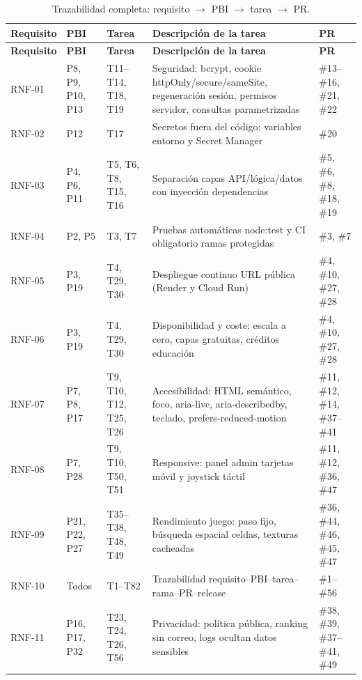 {\small
\sloppy
\begin{longtable}{@{}L{1.4cm} L{0.7cm} L{1.2cm} L{6.8cm} L{3.2cm}@{}}
\caption{Trazabilidad completa: requisito $\rightarrow$ PBI $\rightarrow$ tarea $\rightarrow$ PR.}\label{tab:trazabilidad-completa}\\
\toprule
\textbf{Requisito} & \textbf{PBI} & \textbf{Tarea} & \textbf{Descripción de la tarea} & \textbf{PR} \\ \midrule \endfirsthead
\toprule
\textbf{Requisito} & \textbf{PBI} & \textbf{Tarea} & \textbf{Descripción de la tarea} & \textbf{PR} \\ \midrule \endhead
RNF-01 & P8, P9, P10, P13 & T11--\allowbreak T14, T18, T19 & Seguridad: bcrypt, cookie httpOnly/secure/sameSite, regeneración sesión, permisos servidor, consultas parametrizadas & \#13--\#16, \#21, \#22 \\
RNF-02 & P12 & T17 & Secretos fuera del código: variables entorno y Secret Manager & \#20 \\
RNF-03 & P4, P6, P11 & T5, T6, T8, T15, T16 & Separación capas API/lógica/datos con inyección dependencias & \#5, \#6, \#8, \#18, \#19 \\
RNF-04 & P2, P5 & T3, T7 & Pruebas automáticas node:test y CI obligatorio ramas protegidas & \#3, \#7 \\
RNF-05 & P3, P19 & T4, T29, T30 & Despliegue continuo URL pública (Render y Cloud Run) & \#4, \#10, \#27, \#28 \\
RNF-06 & P3, P19 & T4, T29, T30 & Disponibilidad y coste: escala a cero, capas gratuitas, créditos educación & \#4, \#10, \#27, \#28 \\
RNF-07 & P7, P8, P17 & T9, T10, T12, T25, T26 & Accesibilidad: HTML semántico, foco, aria-live, aria-describedby, teclado, prefers-reduced-motion & \#11, \#12, \#14, \#37--\#41 \\
RNF-08 & P7, P28 & T9, T10, T50, T51 & Responsive: panel admin tarjetas móvil y joystick táctil & \#11, \#12, \#36, \#47 \\
RNF-09 & P21, P22, P27 & T35--\allowbreak T38, T48, T49 & Rendimiento juego: paso fijo, búsqueda espacial celdas, texturas cacheadas & \#36, \#44, \#46, \#45, \#47 \\
RNF-10 & Todos & T1--\allowbreak T82 & Trazabilidad requisito--\allowbreak PBI--\allowbreak tarea--\allowbreak rama--\allowbreak PR--\allowbreak release & \#1--\#56 \\
RNF-11 & P16, P17, P32 & T23, T24, T26, T56 & Privacidad: política pública, ranking sin correo, logs ocultan datos sensibles & \#38, \#39, \#37--\#41, \#49 \\

\end{longtable}}
